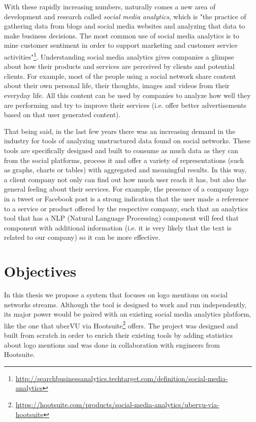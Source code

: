 With these rapidly increasing numbers, naturally comes a new area of
development and research called \textit{social media analytics}, which is "the
practice of gathering data from blogs and social media websites and analyzing
that data to make business decisions. The most common use of social media
analytics is to mine customer sentiment in order to support marketing and
customer service
activities"\footnote{\url{http://searchbusinessanalytics.techtarget.com/definition/social-media-analytics}}.
Understanding social media analytics gives companies a glimpse about how their
products and services are perceived by clients and potential clients. For
example, most of the people using a social network share content about their
own personal life, their thoughts, images and videos from their everyday life.
All this content can be used by companies to analyze how well they are
performing and try to improve their services (i.e. offer better advertisements
based on that user generated content).

That being said, in the last few years there was an increasing demand in the
industry for tools of analyzing unstructured data found on social networks.
These tools are specifically designed and built to consume as much data as they
can from the social platforms, process it and offer a variety of
representations (such as graphs, charts or tables) with aggregated and
meaningful results. In this way, a client company not only can find out how
much user reach it has, but also the general feeling about their services. For
example, the presence of a company logo in a tweet or Facebook post is a
strong indication that the user made a reference to a service or product
offered by the respective company, such that an analytics tool that has a
NLP (Natural Language Processing) component will feed that component with
additional information (i.e. it is very likely that the text is related to our
company) so it can be more effective.

\section{Objectives}
\label{sec:proj-objectives}

In this thesis we propose a system that focuses on logo mentions on social
networks streams. Although the tool is designed to work and run independently,
its major power would be paired with an existing social media analytics
platform, like the one that uberVU via
Hootsuite\footnote{\url{https://hootsuite.com/products/social-media-analytics/ubervu-via-hootsuite}}
offers. The project was designed and built from scratch in order to enrich
their existing tools by adding statistics about logo mentions and was done in
collaboration with engineers from Hootsuite.

